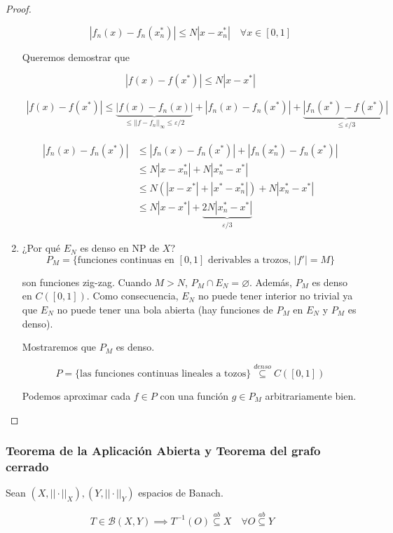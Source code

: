 \begin{proof}
\begin{enumerate}
        \[|f_n(x)-f_n(x_n^*)|\leq N|x-x_n^*|\quad \forall x\in[0,1]\]

        Queremos demostrar que 

        \[|f(x)-f(x^*)|\leq N|x-x^*|\]

        \begin{align*}
            |f(x)-f(x^*)|\leq \underbrace{|f(x)-f_n(x)|}_{\leq ||f-f_n||_\infty\leq \varepsilon/2}+|f_n(x)-f_n(x^*)|+\underbrace{|f_n(x^*)-f(x^*)|}_{\leq \varepsilon/3}
        \end{align*}

        \begin{align*}
            |f_n(x)-f_n(x^*)|&\leq |f_n(x)-f_n(x^*)|+|f_n(x_n^*)-f_n(x^*)|\\
            &\leq N|x-x_n^*|+N|x_n^*-x^*|\\
            &\leq N(|x-x^*|+|x^*-x_n^*|)+N|x_n^*-x^*|\\
            &\leq N|x-x^*|+\underbrace{2N|x_n^*-x^*|}_{\varepsilon/3}
        \end{align*}

        \item ¿Por qué $E_N$ es denso en NP de $X$?
        \[P_M=\{\text{funciones continuas en $[0,1]$ derivables a trozos, }|f'|=M\}\]

        son funciones zig-zag. Cuando $M>N$, $P_M\cap E_N=\varnothing$. Además, $P_M$ es denso en $C([0,1])$.
        Como consecuencia, $E_N$ no puede tener interior no trivial ya que $E_N$ no puede tener una bola abierta (hay funciones de $P_M$ en $E_N$ y $P_M$ es denso).

        Mostraremos que  $P_M$ es denso.

        \[P=\{\text{las funciones continuas lineales a tozos}\}\overset{denso}{\subseteq}C([0,1])\]

        Podemos aproximar cada $f\in P$ con una función $g\in P_M$ arbitrariamente bien.
    \end{enumerate}
\end{proof}

\subsubsection*{Teorema de la Aplicación Abierta y Teorema del grafo cerrado}

Sean $(X,||\cdot||_X),(Y,||\cdot||_Y)$ espacios de Banach.

\[T\in \mathcal{B}(X,Y)\implies T^{-1}(O)\overset{ab}{\subseteq}X\quad \forall O\overset{ab}{\subseteq}Y\]

